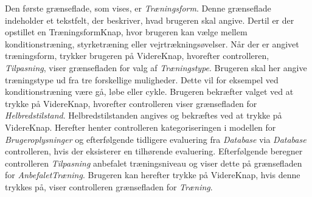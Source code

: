 \noindent
Den første grænseflade, som vises, er \textit{Træningsform}. Denne grænseflade indeholder et tekstfelt, der beskriver, hvad brugeren skal angive. Dertil er der opstillet en TræningsformKnap, hvor brugeren kan vælge mellem konditionstræning, styrketræning eller vejrtrækningsøvelser. Når der er angivet træningsform, trykker brugeren på VidereKnap, hvorefter controlleren, \textit{Tilpasning}, viser grænsefladen for valg af \textit{Træningstype}. Brugeren skal her angive træningstype ud fra tre forskellige muligheder. Dette vil for eksempel ved konditionstræning være gå, løbe eller cykle. Brugeren bekræfter valget ved at trykke på VidereKnap, hvorefter controlleren viser grænsefladen for \textit{Helbredstilstand}. Helbredstilstanden angives og bekræftes ved at trykke på VidereKnap. Herefter henter controlleren kategoriseringen i modellen for \textit{Brugeroplysninger} og efterfølgende tidligere evaluering fra \textit{Database} via \textit{Database} controlleren, hvis der eksisterer en tilhørende evaluering.
Efterfølgende beregner controlleren \textit{Tilpasning} anbefalet træningsniveau og viser dette på grænsefladen for \textit{AnbefaletTræning}. Brugeren kan herefter trykke på VidereKnap, hvis denne trykkes på, viser controlleren grænsefladen for \textit{Træning}. 
